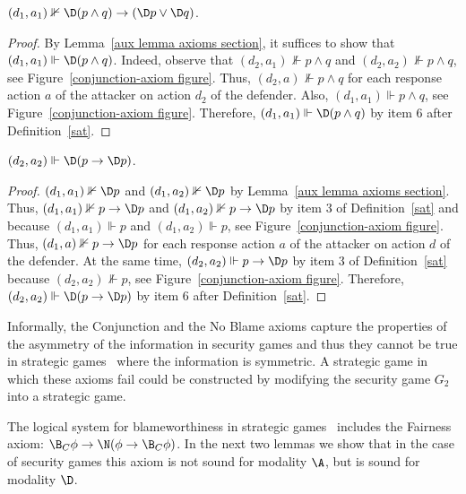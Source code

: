 \documentclass[letterpaper]{article}
\begin{document}
\begin{lemma}\label{conjunction lemma axioms section}
$(d_1,a_1)\nVdash \D(p\wedge q)\to(\D p\vee\D q)$.
\end{lemma}
\begin{proof}
By Lemma~\ref{aux lemma axioms section}, it suffices to show that $(d_1,a_1)\Vdash \D(p\wedge q)$. Indeed, observe that $(d_2,a_1)\nVdash p\wedge q$ and $(d_2,a_2)\nVdash p\wedge q$, see Figure~\ref{conjunction-axiom figure}. Thus, $(d_2,a)\nVdash p\wedge q$ for each response action $a$ of the attacker on action $d_2$ of the defender. Also, $(d_1,a_1)\Vdash p\wedge q$, see Figure~\ref{conjunction-axiom figure}. Therefore, $(d_1,a_1)\Vdash \D(p\wedge q)$ by item 6 after Definition~\ref{sat}.
\end{proof}


\begin{lemma}\label{no blame lemma axioms section}
$(d_2,a_2)\Vdash \D(p\to\D p)$.
\end{lemma}
\begin{proof}
$(d_1,a_1)\nVdash \D p$ and $(d_1,a_2)\nVdash \D p$ by Lemma~\ref{aux lemma axioms section}. Thus, $(d_1,a_1)\nVdash p\to \D p$ and $(d_1,a_2)\nVdash p\to \D p$ by item 3 of Definition~\ref{sat} and because $(d_1,a_1)\Vdash p$ and $(d_1,a_2)\Vdash p$, see Figure~\ref{conjunction-axiom figure}. Thus, $(d_1,a)\nVdash p\to \D p$ for each response action $a$ of the attacker on action $d$ of the defender. At the same time, $(d_2,a_2)\Vdash p\to\D p$ by item 3 of Definition~\ref{sat} because $(d_2,a_2)\nVdash p$, see Figure~\ref{conjunction-axiom figure}. Therefore, $(d_2,a_2)\Vdash \D(p\to\D p)$ by item 6 after Definition~\ref{sat}.
\end{proof}

Informally, the Conjunction and the No Blame axioms capture the properties of the asymmetry of the information in security games and thus they cannot be true in strategic games~\cite{nt19aaai} where the information is symmetric. A strategic game in which these axioms fail could be constructed by modifying the security game $G_2$ into a strategic game.

The logical system for blameworthiness in strategic games~\cite{nt19aaai} includes the Fairness axiom: $\B_C\phi\to\N(\phi\to\B_C\phi)$. In the next two lemmas we show that in the case of security games this axiom is not sound for modality $\A$, but is sound for modality $\D$.
\end{document}
